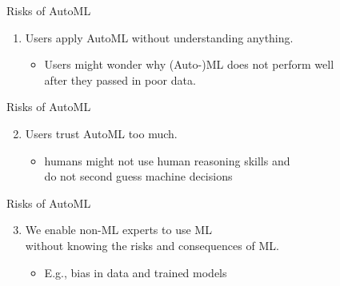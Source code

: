 \begin{frame}[c]{Risks of AutoML}

\begin{enumerate}
	\item Users apply AutoML \alert{without understanding} anything.
	\begin{itemize}
		\item Users might wonder why (Auto-)ML does not perform well\\ after they passed in poor data. 
	\end{itemize}
\end{enumerate}

\end{frame}
\begin{frame}[c]{Risks of AutoML}

\begin{enumerate}\setcounter{enumi}{1}
	\item Users \alert{trust} AutoML too much.
	\begin{itemize}
		\item humans might not use human reasoning skills and\\ do not second guess machine decisions
	\end{itemize}
\end{enumerate}

\end{frame}
\begin{frame}[c]{Risks of AutoML}

\begin{enumerate}\setcounter{enumi}{2}
	\item We enable non-ML experts to use ML\\ \alert{without knowing the risks and consequences} of ML.
	\begin{itemize}
		\item E.g., bias in data and trained models
	\end{itemize}
\end{enumerate}

\end{frame}
